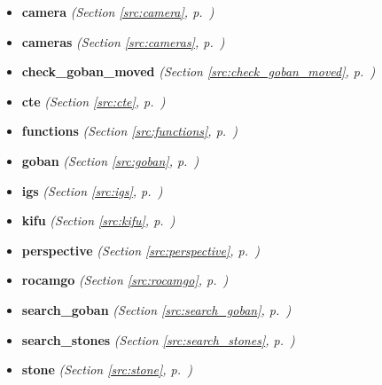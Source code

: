 \begin{itemize}
\setlength{\parskip}{0ex}
\item \textbf{camera}
  \textit{(Section \ref{src:camera}, p.~\pageref{src:camera})}

\item \textbf{cameras}
  \textit{(Section \ref{src:cameras}, p.~\pageref{src:cameras})}

\item \textbf{check\_goban\_moved}
  \textit{(Section \ref{src:check_goban_moved}, p.~\pageref{src:check_goban_moved})}

\item \textbf{cte}
  \textit{(Section \ref{src:cte}, p.~\pageref{src:cte})}

\item \textbf{functions}
  \textit{(Section \ref{src:functions}, p.~\pageref{src:functions})}

\item \textbf{goban}
  \textit{(Section \ref{src:goban}, p.~\pageref{src:goban})}

\item \textbf{igs}
  \textit{(Section \ref{src:igs}, p.~\pageref{src:igs})}

\item \textbf{kifu}
  \textit{(Section \ref{src:kifu}, p.~\pageref{src:kifu})}

\item \textbf{perspective}
  \textit{(Section \ref{src:perspective}, p.~\pageref{src:perspective})}

\item \textbf{rocamgo}
  \textit{(Section \ref{src:rocamgo}, p.~\pageref{src:rocamgo})}

\item \textbf{search\_goban}
  \textit{(Section \ref{src:search_goban}, p.~\pageref{src:search_goban})}

\item \textbf{search\_stones}
  \textit{(Section \ref{src:search_stones}, p.~\pageref{src:search_stones})}

\item \textbf{stone}
  \textit{(Section \ref{src:stone}, p.~\pageref{src:stone})}

\end{itemize}



